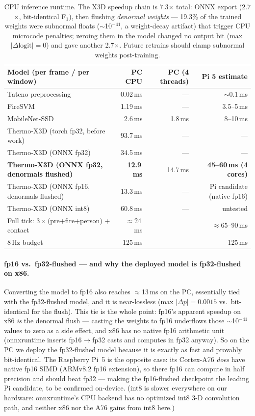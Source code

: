 \documentclass[11pt]{article}
\begin{document}
\begin{table}[H]\centering\small
\begin{tabular}{lrrr}
\toprule
Model (per frame / per window) & PC CPU & PC (4 threads) & Pi 5 estimate\\
\midrule
Tateno preprocessing & 0.02\,ms & --- & $\sim$0.1\,ms\\
FireSVM & 1.19\,ms & --- & 3.5--5\,ms\\
MobileNet-SSD & 2.6\,ms & 1.8\,ms & 8--10\,ms\\
Thermo-X3D (torch fp32, before work) & 93.7\,ms & --- & ---\\
Thermo-X3D (ONNX fp32) & 34.5\,ms & --- & ---\\
\textbf{Thermo-X3D (ONNX fp32, denormals flushed)} & \textbf{12.9\,ms} & 14.7\,ms & \textbf{45--60\,ms (4 cores)}\\
Thermo-X3D (ONNX fp16, denormals flushed) & 13.3\,ms & --- & Pi candidate (native fp16)\\
Thermo-X3D (ONNX int8) & 60.8\,ms & --- & untested\\
\midrule
Full tick: $3\times$(pre+fire+person) + contact & $\approx$24\,ms & & $\approx$65--90\,ms\\
8\,Hz budget & 125\,ms & & 125\,ms\\
\bottomrule
\end{tabular}
\caption{CPU inference runtime. The X3D speedup chain is 7.3$\times$
total: ONNX export (2.7$\times$, bit-identical F$_1$), then flushing
\emph{denormal weights} --- 19.3\% of the trained weights were subnormal
floats ($\sim$10$^{-41}$, a weight-decay artifact) that trigger CPU
microcode penalties; zeroing them in the model changed no output bit
(max $|\Delta\text{logit}|=0$) and gave another 2.7$\times$. Future
retrains should clamp subnormal weights post-training.}
\end{table}

\paragraph{fp16 vs.\ fp32-flushed --- and why the deployed model is
fp32-flushed on x86.} Converting the model to fp16 also reaches
$\approx$13\,ms on the PC, essentially tied with the fp32-flushed model,
and it is near-lossless (max $|\Delta p|=0.0015$ vs.\ bit-identical for the
flush). This tie is the whole point: fp16's apparent speedup on x86 \emph{is}
the denormal flush --- casting the weights to fp16 underflows those
$\sim$10$^{-41}$ values to zero as a side effect, and x86 has no native
fp16 arithmetic unit (onnxruntime inserts fp16$\rightarrow$fp32 casts and
computes in fp32 anyway). So on the PC we deploy the fp32-flushed model
because it is exactly as fast and provably bit-identical. The Raspberry
Pi~5 is the opposite case: its Cortex-A76 \emph{does} have native fp16 SIMD
(ARMv8.2 fp16 extension), so there fp16 can compute in half precision and
should beat fp32 --- making the fp16-flushed checkpoint the leading Pi
candidate, to be confirmed on-device. (int8 is slower everywhere on our
hardware: onnxruntime's CPU backend has no optimized int8 3-D convolution
path, and neither x86 nor the A76 gains from int8 here.)
\end{document}
